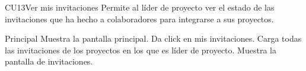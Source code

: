 
% 



	\begin{UseCase}{CU13}{Ver mis invitaciones}{
		Permite al líder de proyecto ver el estado de las invitaciones que ha hecho a colaboradores para integrarse a sus proyectos.
	}
	\end{UseCase}
	\begin{UCtrayectoria}{Principal}
      \UCpaso  Muestra la pantalla principal.
		\UCpaso[\UCactor]Da click en mis invitaciones.
      \UCpaso  Carga todas las invitaciones de los proyectos en los que es líder de proyecto.
      \UCpaso  Muestra la pantalla de invitaciones.
	\end{UCtrayectoria}

		
